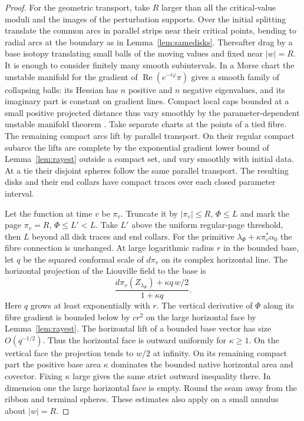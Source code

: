 \begin{proof}
For the geometric transport, take $R$ larger than all the critical-value moduli and the images of the perturbation supports. Over the initial splitting translate the common arcs in parallel strips near their critical points, bending to radial arcs at the boundary as in Lemma~\ref{lem:samedisks}. Thereafter drag by a base isotopy translating small balls of the moving values and fixed near $|w|=R$. It is enough to consider finitely many smooth subintervals. In a Morse chart the unstable manifold for the gradient of $\operatorname{Re}(e^{-i\varphi}\pi)$ gives a smooth family of collapsing balls: its Hessian has $n$ positive and $n$ negative eigenvalues, and its imaginary part is constant on gradient lines. Compact local caps bounded at a small positive projected distance thus vary smoothly by the parameter-dependent unstable manifold theorem \cite[Lemmas~1.13--1.14]{Sei}. Take separate charts at the points of a tied fibre. The remaining compact arcs lift by parallel transport. On their regular compact subarcs the lifts are complete by the exponential gradient lower bound of Lemma~\ref{lem:rayest} outside a compact set, and vary smoothly with initial data. At a tie their disjoint spheres follow the same parallel transport. The resulting disks and their end collars have compact traces over each closed parameter interval.

Let the function at time $v$ be $\pi_v$. Truncate it by $|\pi_v|\le R$, $\Phi\le L$ and mark the page $\pi_v=R$, $\Phi\le L'<L$. Take $L'$ above the uniform regular-page threshold, then $L$ beyond all disk traces and end collars. For the primitive $\lambda_\Phi+\kappa\pi_v^*\alpha_0$ the fibre connection is unchanged. At large logarithmic radius $r$ in the bounded base, let $q$ be the squared conformal scale of $d\pi_v$ on its complex horizontal line. The horizontal projection of the Liouville field to the base is
\[
                  \frac{d\pi_v(Z_{\lambda_\Phi})+\kappa q\,w/2}
                       {1+\kappa q}.
\]
Here $q$ grows at least exponentially with $r$. The vertical derivative of $\Phi$ along its fibre gradient is bounded below by $c r^2$ on the large horizontal face by Lemma~\ref{lem:rayest}. The horizontal lift of a bounded base vector has size $O(q^{-1/2})$. Thus the horizontal face is outward uniformly for $\kappa\ge1$. On the vertical face the projection tends to $w/2$ at infinity. On its remaining compact part the positive base area $\kappa$ dominates the bounded native horizontal area and covector. Fixing $\kappa$ large gives the same strict outward inequality there. In dimension one the large horizontal face is empty. Round the seam away from the ribbon and terminal spheres. These estimates also apply on a small annulus about $|w|=R$.


\end{proof}
